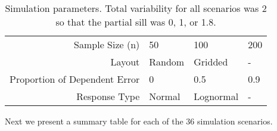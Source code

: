 \documentclass[]{elsarticle} %
\begin{document}
\begin{table}[ht]
\centering
\begin{tabular}{r|lll}
   \hline
Sample Size (n) & 50 & 100 & 200 \\ 
  Layout & Random & Gridded & - \\ 
  Proportion of Dependent Error & 0 & 0.5 & 0.9 \\ 
  Response Type & Normal & Lognormal & - \\ 
   \hline
\end{tabular}
\caption{\label{tab:parmtab} Simulation parameters. Total variability for all scenarios was 2 so that the partial sill was 0, 1, or 1.8.} 
\end{table}

Next we present a summary table for each of the 36 simulation scenarios.
\end{document}
